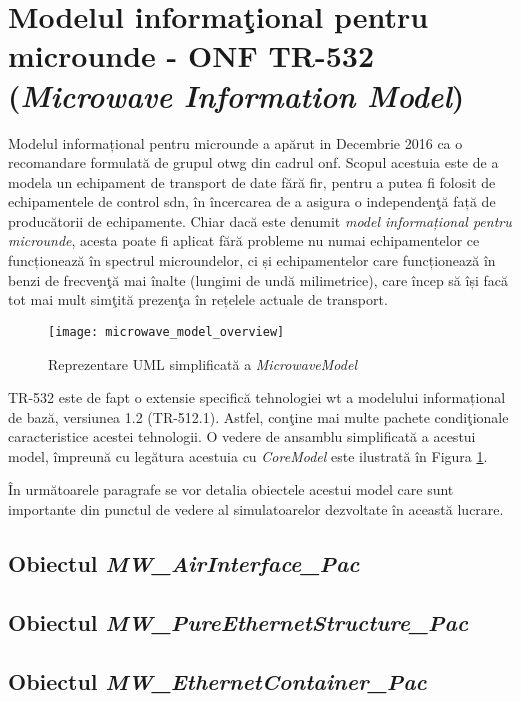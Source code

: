 \section{Modelul informaţional pentru microunde - ONF TR-532 (\textit{Microwave Information Model})}

Modelul informațional pentru microunde \cite{onftr532} a apărut in Decembrie 2016 ca o recomandare formulată de grupul \gls{otwg} din cadrul \gls{onf}. Scopul acestuia este de a modela un echipament de transport de date fără fir, pentru a putea fi folosit de echipamentele de control \gls{sdn}, în încercarea de a asigura o independenţă față de producătorii de echipamente. Chiar dacă este denumit \textit{model informațional pentru microunde}, acesta poate fi aplicat fără probleme nu numai echipamentelor ce funcționează în spectrul microundelor, ci și echipamentelor care funcționează în benzi de frecvenţă mai înalte (lungimi de undă milimetrice), care încep să își facă tot mai mult simţită prezenţa în rețelele actuale de transport.

\begin{figure}[t]
	\centering
	\texttt{[image: microwave\_model\_overview]}
	\caption{Reprezentare UML simplificată a \textit{MicrowaveModel}}
	\label{fig:microwave_model}
\end{figure}


TR-532 este de fapt o extensie specifică tehnologiei \gls{wt} a modelului informațional de bază, versiunea 1.2 (TR-512.1). Astfel, conţine mai multe pachete condiţionale caracteristice acestei tehnologii. O vedere de ansamblu simplificată a acestui model, împreună cu legătura acestuia cu \textit{CoreModel} este ilustrată în Figura \ref{fig:microwave_model}.

În următoarele paragrafe se vor detalia obiectele acestui model care sunt importante din punctul de vedere al simulatoarelor dezvoltate în această lucrare.

\subsection{Obiectul \textit{MW\_AirInterface\_Pac}}

\subsection{Obiectul \textit{MW\_PureEthernetStructure\_Pac}}

\subsection{Obiectul \textit{MW\_EthernetContainer\_Pac}}